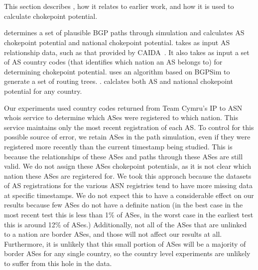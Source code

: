 
\section{\toolname}

This section describes \toolname{}, how it relates to earlier work, and how it is used to calculate chokepoint
potential.

\toolname{} determines a set of plausible BGP paths through simulation and calculates AS
chokepoint potential and national chokepoint potential.  \toolname{} takes as input AS relationship data, such as that provided by
CAIDA~\cite{CAIDA}.  It also takes as input a set of AS
country codes (that identifies which nation an AS belongs to) for
determining chokepoint potential.  \toolname{}
uses an algorithm based on BGPSim \cite{quicksand} to
generate a set of routing trees. . \toolname{} 
calclates both AS and national chokepoint potential for any country.

Our experiments used country codes returned from Team Cymru's IP to
ASN whois service \cite{cymru} to determine which ASes were registered
to which nation.  This service maintains only the most recent
registration of each AS.  To control for this possible source of
error, we retain ASes in the path simulation, even if they were
registered more recently than the current timestamp being studied. This is because
the relationships of these ASes and paths through these ASes are still valid.
We do not assign these ASes chokepoint potentials, as it is not clear which nation
these ASes are registered for. We took this approach
because the datasets of AS registrations for the various ASN
registries tend to have more missing data at specific timestamps.
We do not expect this to have a considerable effect on our results
because few ASes do not have a definite nation (in the best case in the most recent
test this is less than 1\% of ASes, in the worst case in the earliest test this is around 12\% of ASes.)
Additionally, not all of the ASes that are unlinked to a nation are border ASes, and those will not
affect our results at all. Furthermore, it is unlikely that this small portion of ASes will be a majority
of border ASes for any single country, so the country level experiments are unlikely to suffer from this
hole in the data.

